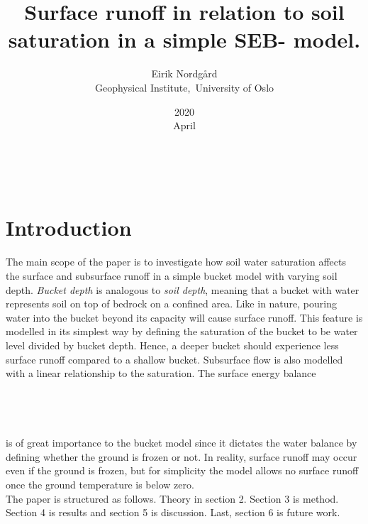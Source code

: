 \documentclass[a4paper,11pt,twocolumn]{article}
\begin{document}
\title{Surface runoff in relation to soil saturation in a simple SEB- model.}
\date{2020\\ April}
\author{Eirik Nordgård\\ Geophysical Institute,\ University of Oslo}


\
\section{Introduction}

The main scope of the paper is to investigate how soil water saturation affects the surface and subsurface runoff in a simple bucket model with varying soil depth. \textit{Bucket depth} is analogous to \textit{soil depth}, meaning that a bucket with water represents soil on top of bedrock on a confined area. Like in nature, pouring water into the bucket beyond its capacity will cause surface runoff. This feature is modelled in its simplest way by defining the saturation of the bucket to be water level divided by bucket depth. Hence, a deeper bucket should experience less surface runoff compared to a shallow bucket. Subsurface flow is also modelled with a linear relationship to the saturation. The surface energy balance 
\\
\\
\\
\\
\\
is of great importance to the bucket model since it dictates the water balance by defining whether the ground is frozen or not. In reality, surface runoff may occur even if the ground is frozen, but for simplicity the model allows no surface runoff once the ground temperature is below zero. 
\\
The paper is structured as follows. Theory in section 2. Section 3 is method. Section 4 is results and section 5 is discussion. Last, section 6 is future work. 
\
\end{document}

